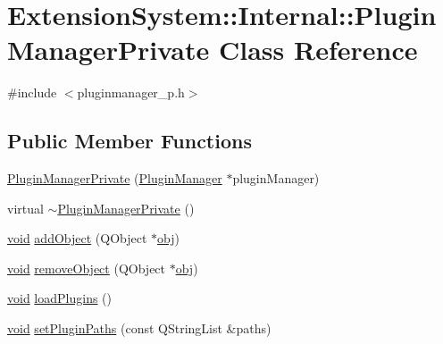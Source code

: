 \hypertarget{class_extension_system_1_1_internal_1_1_plugin_manager_private}{\section{Extension\-System\-:\-:Internal\-:\-:Plugin\-Manager\-Private Class Reference}
\label{class_extension_system_1_1_internal_1_1_plugin_manager_private}
}


{\ttfamily \#include $<$pluginmanager\-\_\-p.\-h$>$}

\subsection*{Public Member Functions}
\begin{DoxyCompactItemize}
\item 
\hyperlink{class_extension_system_1_1_internal_1_1_plugin_manager_private_aa9b980c8b4d4f99bc52edcd02c22a933}{Plugin\-Manager\-Private} (\hyperlink{class_extension_system_1_1_plugin_manager}{Plugin\-Manager} $\ast$plugin\-Manager)
\item 
virtual \hyperlink{class_extension_system_1_1_internal_1_1_plugin_manager_private_a434ba94470f7507ea1c65b6b7f7b58a8}{$\sim$\-Plugin\-Manager\-Private} ()
\item 
\hyperlink{group___u_a_v_objects_plugin_ga444cf2ff3f0ecbe028adce838d373f5c}{void} \hyperlink{class_extension_system_1_1_internal_1_1_plugin_manager_private_a4d9a60e36e831bdafbe905ae247b3cf3}{add\-Object} (Q\-Object $\ast$\hyperlink{glext_8h_a0c0d4701a6c89f4f7f0640715d27ab26}{obj})
\item 
\hyperlink{group___u_a_v_objects_plugin_ga444cf2ff3f0ecbe028adce838d373f5c}{void} \hyperlink{class_extension_system_1_1_internal_1_1_plugin_manager_private_abc89590fec7337cbde0b99711da09329}{remove\-Object} (Q\-Object $\ast$\hyperlink{glext_8h_a0c0d4701a6c89f4f7f0640715d27ab26}{obj})
\item 
\hyperlink{group___u_a_v_objects_plugin_ga444cf2ff3f0ecbe028adce838d373f5c}{void} \hyperlink{class_extension_system_1_1_internal_1_1_plugin_manager_private_a5097be47257a455a1c7347b67982b600}{load\-Plugins} ()
\item 
\hyperlink{group___u_a_v_objects_plugin_ga444cf2ff3f0ecbe028adce838d373f5c}{void} \hyperlink{class_extension_system_1_1_internal_1_1_plugin_manager_private_a38c08e6dbab3c28d6b00dac7e1e6f976}{set\-Plugin\-Paths} (const Q\-String\-List \&paths)

\end{DoxyCompactItemize}
